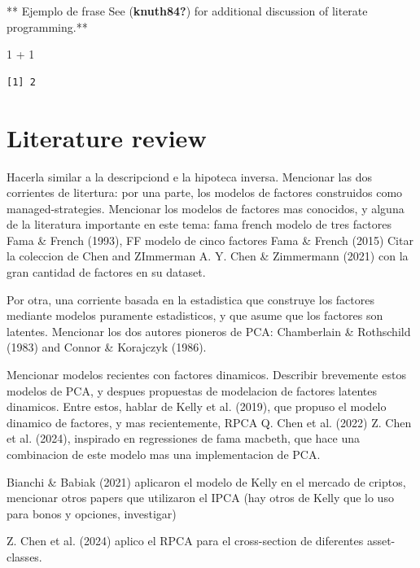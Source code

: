 \documentclass[
  11pt,
  a4paper,
  openany]{scrreprt}
\newenvironment{Shaded}{\begin{snugshade}}{\end{snugshade}}
\newcommand{\DecValTok}[1]{\textcolor[rgb]{0.68,0.00,0.00}{#1}}
\newcommand{\SpecialCharTok}[1]{\textcolor[rgb]{0.37,0.37,0.37}{#1}}
\begin{document}
** Ejemplo de frase See (\textbf{knuth84?}) for additional discussion of
literate programming.**

\begin{Shaded}
\begin{Highlighting}[]
\DecValTok{1} \SpecialCharTok{+} \DecValTok{1}
\end{Highlighting}
\end{Shaded}

\begin{verbatim}
[1] 2
\end{verbatim}


\chapter{Literature review}\label{literature-review}

Hacerla similar a la descripciond e la hipoteca inversa. Mencionar las
dos corrientes de litertura: por una parte, los modelos de factores
construidos como managed-strategies. Mencionar los modelos de factores
mas conocidos, y alguna de la literatura importante en este tema: fama
french modelo de tres factores Fama \& French (1993), FF modelo de cinco
factores Fama \& French (2015) Citar la coleccion de Chen and ZImmerman
A. Y. Chen \& Zimmermann (2021) con la gran cantidad de factores en su
dataset.

Por otra, una corriente basada en la estadistica que construye los
factores mediante modelos puramente estadisticos, y que asume que los
factores son latentes. Mencionar los dos autores pioneros de PCA:
Chamberlain \& Rothschild (1983) and Connor \& Korajczyk (1986).

Mencionar modelos recientes con factores dinamicos. Describir brevemente
estos modelos de PCA, y despues propuestas de modelacion de factores
latentes dinamicos. Entre estos, hablar de Kelly et al. (2019), que
propuso el modelo dinamico de factores, y mas recientemente, RPCA Q.
Chen et al. (2022) Z. Chen et al. (2024), inspirado en regressiones de
fama macbeth, que hace una combinacion de este modelo mas una
implementacion de PCA.

Bianchi \& Babiak (2021) aplicaron el modelo de Kelly en el mercado de
criptos, mencionar otros papers que utilizaron el IPCA (hay otros de
Kelly que lo uso para bonos y opciones, investigar)

Z. Chen et al. (2024) aplico el RPCA para el cross-section de diferentes
asset-classes.
\end{document}
